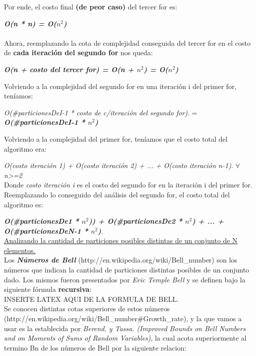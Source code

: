 \documentclass[10pt,a4paper]{article}
\begin{document}
\noindent Por ende, el costo final \textbf{(de peor caso)} del tercer for es:

\textit{\textbf{O(n * n) = O($n^2$)}}\\ \\

Ahora, reemplazando la cota de complejidad conseguida del tercer for en el costo de \textbf{cada iteración del segundo for} nos queda:

\textbf{\textit{O(n + costo del tercer for) = O(n + $n^2$) = O($n^2$)}}

\noindent Volviendo a la complejidad del segundo for en una iteración i del primer for, teníamos:

\textit{O(\#particionesDeI-1 * costo de c/iteración del segundo for)}. = \textbf{\textit{O(\#particionesDeI-1 * $n^2$)}}

\newpage
Volviendo a la complejidad del primer for, teníamos que el costo total del algoritmo era:

\textit{O(costo iteración 1) + O(costo iteración 2) + ... + O(costo iteración n-1)}. $\forall$\textit{n\textgreater =2}\\
Donde \textit{costo iteración i} es el costo del segundo for en la iteración i del primer for.\\

Reemplazando lo conseguido del análisis del segundo for, el costo total del algoritmo es:

\textbf{\textit{O(\#particionesDe1 * $n^2$)) + O(\#particionesDe2 * $n^2$) + ... + O(\#particionesDeN-1 * $n^2$)}}.\\



\underline{Analizando la cantidad de particiones posibles distintas de un conjunto de N elementos.}\\
Los \textbf{\textit{Números de Bell}} (http://en.wikipedia.org/wiki/Bell\_number) son los números que indican la cantidad de particiones distintas posibles de un conjunto dado. Los mismos fueron presentados por \textit{Eric Temple Bell} y se definen bajo la siguiente fórmula \textbf{recursiva}:\\

INSERTE LATEX AQUI DE LA FORMULA DE BELL.\\

Se conocen distintas cotas superiores de estos números (http://en.wikipedia.org/wiki/Bell\_number\#Growth\_rate), y la que vamos a usar es la establecida por \textit{Berend. y Tassa. (Improved Bounds on Bell Numbers and on Moments of Sums of Random Variables)}, la cual acota superiormente al termino Bn de los números de Bell por la siguiente relacion:\\
\end{document}
